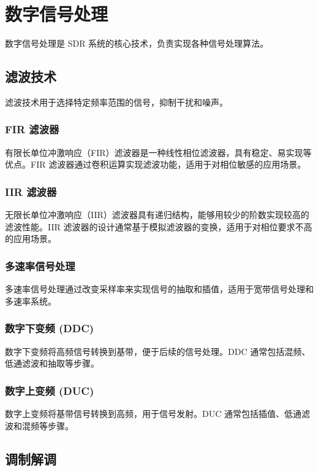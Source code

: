 \documentclass[UTF8]{ctexbook}
\begin{document}
\section{数字信号处理}

数字信号处理是 SDR 系统的核心技术，负责实现各种信号处理算法。

\subsection{滤波技术}

滤波技术用于选择特定频率范围的信号，抑制干扰和噪声。

\subsubsection{FIR 滤波器}

有限长单位冲激响应（FIR）滤波器是一种线性相位滤波器，具有稳定、易实现等优点。FIR 滤波器通过卷积运算实现滤波功能，适用于对相位敏感的应用场景。

\subsubsection{IIR 滤波器}

无限长单位冲激响应（IIR）滤波器具有递归结构，能够用较少的阶数实现较高的滤波性能。IIR 滤波器的设计通常基于模拟滤波器的变换，适用于对相位要求不高的应用场景。

\subsubsection{多速率信号处理}

多速率信号处理通过改变采样率来实现信号的抽取和插值，适用于宽带信号处理和多速率系统。

\subsubsection{数字下变频 (DDC)}

数字下变频将高频信号转换到基带，便于后续的信号处理。DDC 通常包括混频、低通滤波和抽取等步骤。

\subsubsection{数字上变频 (DUC)}

数字上变频将基带信号转换到高频，用于信号发射。DUC 通常包括插值、低通滤波和混频等步骤。

\subsection{调制解调}
\end{document}
